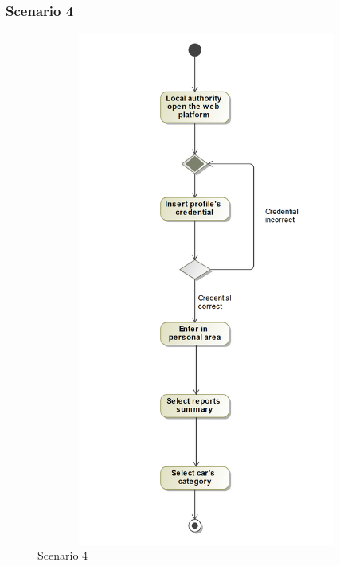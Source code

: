\subsubsection{Scenario 4}
\begin{figure}[H]
	\begin{minipage}[b]{0.40\textwidth}
		\includegraphics[width=12cm,height=17cm]{Images/ActivityRASD/Scenario4.png}
		\caption{Scenario 4}
	\end{minipage}
\end{figure}
\newpage
